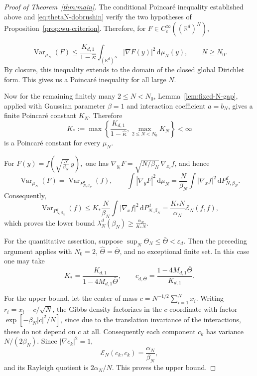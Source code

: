 \documentclass[12pt,reqno,letterpaper]{amsart}
\theoremstyle{definition}
\theoremstyle{remark}
\numberwithin{equation}{section}
\newcommand{\R}{\mathbb R}
\newcommand{\dd}{\,\mathrm d}
\newcommand{\be}{\beta}
\newcommand{\al}{\alpha}
\newcommand{\cE}{\mathcal E}
\newcommand{\Var}{\operatorname{Var}}
\begin{document}
\begin{proof}[Proof of Theorem~\ref{thm:main}]
The conditional Poincar\'e inequality established above and
\eqref{eq:thetaN-dobrushin} verify the two hypotheses of
Proposition~\ref{prop:wu-criterion}. Therefore, for \(F\in C_c^\infty((\R^d)^N)\),

\begin{equation}\label{eq:large-N-uniform-PI}
 \Var_{\mu_N}(F)
 \le \frac{K_{d,1}}{1-\widehat\kappa}
 \int_{(\R^d)^N}|\nabla F(y)|^2\dd\mu_N(y),
 \qquad N\ge N_0.
\end{equation}
By closure, this inequality extends to the domain of the closed global
Dirichlet form. This gives us a Poincar\'e inequality for all large $N$. 

Now for the remaining finitely many \(2\le N<N_0\), Lemma~\ref{lem:fixed-N-gap}, applied with Gaussian
parameter \(\be=1\) and interaction coefficient \(a=b_N\), gives a finite
Poincar\'e constant \(K_N\).  Therefore
\[
 K_*:=\max\left\{
 \frac{K_{d,1}}{1-\widehat\kappa},
 \max_{2\le N<N_0}K_N\right\}<\infty
\]
is a Poincar\'e constant for every \(\mu_N\).

For $F(y)=f\!\left(\sqrt{\frac{N}{\be_N}}\,y\right),$
one has \(\nabla_{y_i}F=\sqrt{N/\be_N}\,\nabla_{x_i}f\), and hence
\[
 \Var_{\mu_N}(F)=\Var_{P_{N,\be_N}^{d}}(f),
 \qquad
 \int|\nabla_yF|^2\dd\mu_N
 =\frac{N}{\be_N}\int|\nabla_xf|^2\dd P_{N,\be_N}^{d}.
\]
Consequently,
\[
 \Var_{P_{N,\be_N}^{d}}(f)
 \le K_*\frac{N}{\be_N}\int|\nabla_xf|^2\dd P_{N,\be_N}^{d}
 =\frac{K_*N}{\al_N}\cE_N(f,f),
\]
which proves the lower bound $\lambda_N^d(\be_N)\ge\frac{\al_N}{K_*N}.$

For the quantitative assertion, suppose
\(\sup_N\Theta_N\le\bar\Theta<\varepsilon_d\).  Then the preceding
argument applies with \(N_0=2\),
\(\widehat\Theta=\bar\Theta\), and no exceptional finite set.  In this case one may take
\[
 K_*=\frac{K_{d,1}}{1-4M_{d,1}\bar\Theta},
 \qquad
 c_{d,\bar\Theta}
 =\frac{1-4M_{d,1}\bar\Theta}{K_{d,1}}.
\]

For the upper bound, let the center of mass $c=N^{-1/2}\sum_{i=1}^N x_i.$
Writing \(r_i=x_i-c/\sqrt N\), the Gibbs density factorizes in the
\(c\)-coordinate with factor \(\exp[-\be_N|c|^2/N]\), since due to the translation invariance of the interactions, these do not depend on \(c\) at all.  Consequently each component
\(c_k\) has variance \(N/(2\be_N)\).  Since \(|\nabla c_k|^2=1\),
\[
 \cE_N(c_k,c_k)=\frac{\al_N}{\be_N},
\]
and its Rayleigh quotient is \(2\al_N/N\).  This proves the upper bound.
\end{proof}
\end{document}
